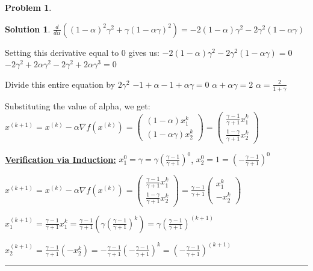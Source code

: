 \documentclass{article}
\theoremstyle{definition}
\newtheorem{problem}{Problem}
\def\fline{\rule{0.75\linewidth}{0.5pt}}
\newcommand{\finishline}{\begin{center}\fline\end{center}}
\newtheorem*{solution*}{Solution}
\newenvironment{solution}{\begin{solution*}}{{\finishline} \end{solution*}}
\begin{document}
\begin{problem}
\begin{solution}
$\frac{d}{d\alpha}((1 - \alpha)^2 \gamma^2 + \gamma (1 - \alpha \gamma)^2) = -2(1 - \alpha)\gamma^2 -2\gamma^2 (1 - \alpha \gamma)$

Setting this derivative equal to 0 gives us: \newline 
$-2(1 - \alpha)\gamma^2 -2\gamma^2 (1 - \alpha \gamma) = 0$ \newline 
$-2\gamma^2 + 2\alpha \gamma^2 -2\gamma^2 + 2 \alpha \gamma^3 = 0$ \newline 

Divide this entire equation by $2\gamma^2$ \newline 
$-1 + \alpha - 1 + \alpha \gamma = 0$ \newline 
$\alpha + \alpha \gamma = 2$ \newline 
$\alpha = \frac{2}{1 + \gamma}$ \newline 

Substituting the value of alpha, we get: \newline
$x^{(k + 1)} = x^{(k)} - \alpha \nabla f(x^{(k)}) = \begin{pmatrix}
(1 - \alpha) x_1^k \\
(1 - \alpha \gamma) x_2^k
\end{pmatrix} = \begin{pmatrix}
\frac{\gamma - 1}{\gamma + 1} x_1^k \\
\frac{1 - \gamma}{\gamma + 1} x_2^k
\end{pmatrix}$ \newline 


\textbf{\underline{Verification via Induction:}} \newline 
$x_1^0 = \gamma = \gamma (\frac{\gamma - 1}{\gamma + 1})^0$, $x_2^0 = 1 =(-\frac{\gamma - 1}{\gamma + 1})^0$

$x^{(k + 1)} = x^{(k)} - \alpha \nabla f(x^{(k)}) = \begin{pmatrix}
\frac{\gamma - 1}{\gamma + 1} x_1^k \\
\frac{1 - \gamma}{\gamma + 1} x_2^k
\end{pmatrix} = \frac{\gamma - 1}{\gamma + 1} \begin{pmatrix}
    x_1^k \\
    -x_2^k
\end{pmatrix}$

$x_1^{(k + 1)} = \frac{\gamma - 1}{\gamma + 1} x_1^k = \frac{\gamma - 1}{\gamma + 1} (\gamma (\frac{\gamma - 1}{\gamma + 1})^k) = \gamma (\frac{\gamma - 1}{\gamma + 1})^{(k + 1)}$

$x_2^{(k + 1)} = \frac{\gamma - 1}{\gamma + 1} (-x_2^k) = -\frac{\gamma - 1}{\gamma + 1} (-\frac{\gamma - 1}{\gamma + 1})^k = (-\frac{\gamma - 1}{\gamma + 1})^{(k + 1)}$


\end{solution}
\end{problem}
\end{document}
